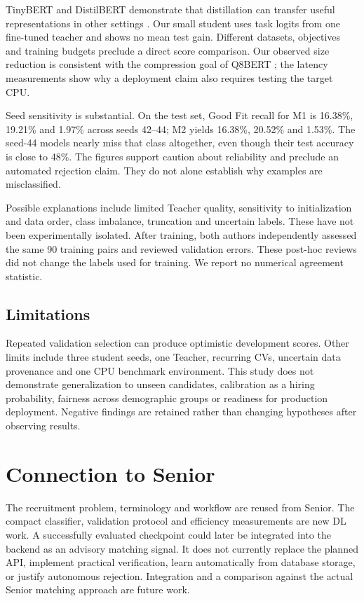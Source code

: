 \documentclass[11pt]{article}
\begin{document}
TinyBERT and DistilBERT demonstrate that distillation can transfer useful representations in other settings \citep{tinybert,distilbert}. Our small student uses task logits from one fine-tuned teacher and shows no mean test gain. Different datasets, objectives and training budgets preclude a direct score comparison. Our observed size reduction is consistent with the compression goal of Q8BERT \citep{q8}; the latency measurements show why a deployment claim also requires testing the target CPU.

Seed sensitivity is substantial. On the test set, Good Fit recall for M1 is 16.38\%, 19.21\% and 1.97\% across seeds 42--44; M2 yields 16.38\%, 20.52\% and 1.53\%. The seed-44 models nearly miss that class altogether, even though their test accuracy is close to 48\%. The figures support caution about reliability and preclude an automated rejection claim. They do not alone establish why examples are misclassified.

Possible explanations include limited Teacher quality, sensitivity to initialization and data order, class imbalance, truncation and uncertain labels. These have not been experimentally isolated. After training, both authors independently assessed the same 90 training pairs and reviewed validation errors. These post-hoc reviews did not change the labels used for training. We report no numerical agreement statistic.

\subsection{Limitations}
Repeated validation selection can produce optimistic development scores. Other limits include three student seeds, one Teacher, recurring CVs, uncertain data provenance and one CPU benchmark environment. This study does not demonstrate generalization to unseen candidates, calibration as a hiring probability, fairness across demographic groups or readiness for production deployment. Negative findings are retained rather than changing hypotheses after observing results.

\section{Connection to Senior}
The recruitment problem, terminology and workflow are reused from Senior. The compact classifier, validation protocol and efficiency measurements are new DL work. A successfully evaluated checkpoint could later be integrated into the backend as an advisory matching signal. It does not currently replace the planned API, implement practical verification, learn automatically from database storage, or justify autonomous rejection. Integration and a comparison against the actual Senior matching approach are future work.
\end{document}
